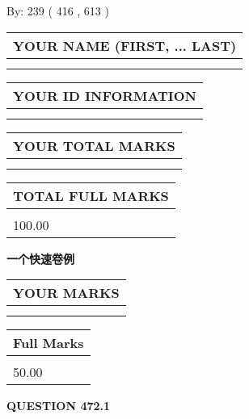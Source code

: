 \documentclass{ctexart}
\begin{document}
   
\hspace{1.0in} By: 
 239 ( 416 ,  613 )
   
   
   
   
\newpage 
\setcounter{page}{ 
   472001 } 
   
   
   
   
\noindent\begin{tabular}{|l|}
\hline
YOUR NAME (FIRST, ... LAST)  \\
\hline
 \\ 
 \\ 
\hline
\end{tabular}
\hspace{0.05in} \begin{tabular}{|l|}
\hline
 YOUR   ID   INFORMATION  \\
\hline
 \\ 
 \\ 
\hline
\end{tabular}
   
   
\vspace{0.2in}\noindent\begin{tabular}{|l|}
\hline
YOUR TOTAL MARKS  \\
\hline
 \\ 
 \\ 
\hline
\end{tabular}
\hspace{0.05in} \begin{tabular}{|l|}
\hline
TOTAL FULL MARKS  \\
\hline
 \\ 
100.00 \\
\hline
\end{tabular}
   
   
 \vspace{0.2in}
{\LARGE {\textbf{ 一个快速卷例}}}
   
   
  
\vspace{0.2in}
  
\noindent\begin{tabular}{|l|}
\hline
 YOUR MARKS  \\
\hline
 \\ 
 \\ 
\hline
\end{tabular}
\hspace{0.05in} \begin{tabular}{|l|}
\hline
 Full Marks  \\
\hline
 \\ 
50.00 \\
\hline
\end{tabular}
{\textbf{\Large{QUESTION
472.1 
}}}
  
\end{document}
